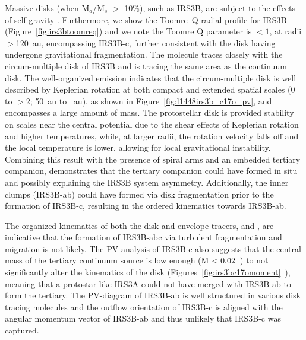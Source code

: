 \documentclass[twocolumn, 12pt, trackchanges]{aastex63}
\begin{document}
Massive disks (when M$_{d}$/M$_{s}$ $>$ 10\%), such as IRS3B, are subject to the effects of self-gravity \citep[][]{1990ApJ...358..515L}.  Furthermore, we show the Toomre~Q radial profile for IRS3B (Figure~\ref{fig:irs3btoomreq}) and we note the Toomre Q parameter is $<1$, at radii $>$120~au, encompassing IRS3B-c, further consistent with the disk having undergone gravitational fragmentation. The molecule \cso\space traces closely with the circum-multiple disk of IRS3B and is tracing the same area as the continuum disk. The well-organized \cso\space emission indicates that the circum-multiple disk is well described by Keplerian rotation at both compact and extended spatial scales (0 to $>$2; 50~au to ~au), as shown in Figure~\ref{fig:l1448irs3b_c17o_pv}, and encompasses a large amount of mass. The protostellar disk is provided stability on scales near the central potential due to the shear effects of Keplerian rotation and higher temperatures, while, at larger radii, the rotation velocity falls off and the local temperature is lower, allowing for local gravitational instability. Combining this result with the presence of spiral arms and an embedded tertiary companion, demonstrates that the tertiary companion could have formed in situ and possibly explaining the IRS3B system asymmetry. Additionally, the inner clumps (IRS3B-ab) could have formed via disk fragmentation prior to the formation of IRS3B-c, resulting in the ordered kinematics towards IRS3B-ab.

The organized kinematics of both the disk and envelope tracers, \cso\space and \htcop, are indicative that the formation of IRS3B-abc via turbulent fragmentation and migration is not likely. The PV analysis of IRS3B-c also suggests that the central mass of the tertiary continuum source is low enough (M$_{\*}<0.02$~\solm) to not significantly alter the kinematics of the disk (Figures~\ref{fig:irs3bc17omoment}~), meaning that a protostar like IRS3A could not have merged with IRS3B-ab to form the tertiary. The PV-diagram of IRS3B-ab is well structured in various disk tracing molecules and the outflow orientation of IRS3B-c is aligned with the angular momentum vector of IRS3B-ab and thus unlikely that IRS3B-c was captured. 
\end{document}
